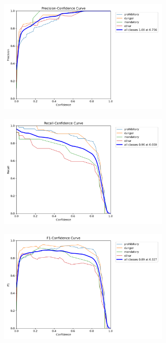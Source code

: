 \documentclass{article}
\begin{document}
\begin{figure}[h]
\begin{subfigure}[b]{0.5\textwidth}
\centering
\includegraphics[width=0.9\textwidth]{resources/general in general P curve.png}
\caption{}
\end{subfigure}
\begin{subfigure}[b]{0.5\textwidth}
\centering
\includegraphics[width=0.9\textwidth]{resources/general in general R curve.png}
\caption{}
\end{subfigure}
\begin{subfigure}[b]{0.5\textwidth}
\centering
\includegraphics[width=0.9\textwidth]{resources/general in general F1 curve.png}

\end{subfigure}
\end{figure}
\end{document}
